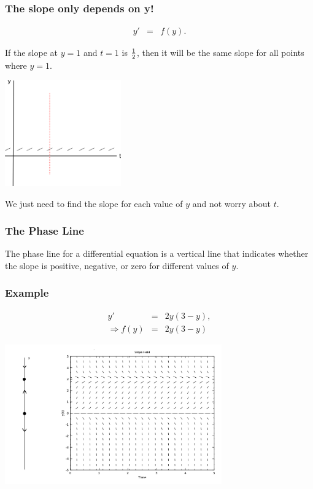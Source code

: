 \begin{frame}
  \frametitle{The slope only depends on y!}

  \vspace*{-3em}
  \begin{eqnarray*}
    y' & = & f(y).
  \end{eqnarray*}

  If the slope at $y=1$ and $t=1$ is $\mbox{$\frac{1}{2}$}$, then it will be the same
  slope for all points where $y=1$. 

  \vfill
  \includegraphics[width=5cm]{img/autonomousEqnSlopeField}
  \vfill

  We just need to find the slope for each value of $y$ and not worry
  about $t$.

\end{frame}

\begin{frame}
  \frametitle{The Phase Line}

  \begin{definition}
    The phase line for a differential equation is a vertical line that
    indicates whether the slope is positive, negative, or zero for
    different values of $y$.
  \end{definition}
\end{frame}

\begin{frame}
  \frametitle{Example}
  \begin{eqnarray*}
    y' & = & 2y(3-y), \\
    \Rightarrow f(y) & = & 2y(3-y)
  \end{eqnarray*}


  \includegraphics[height=6cm]{img/week3PhaseLineExample1}

\end{frame}


